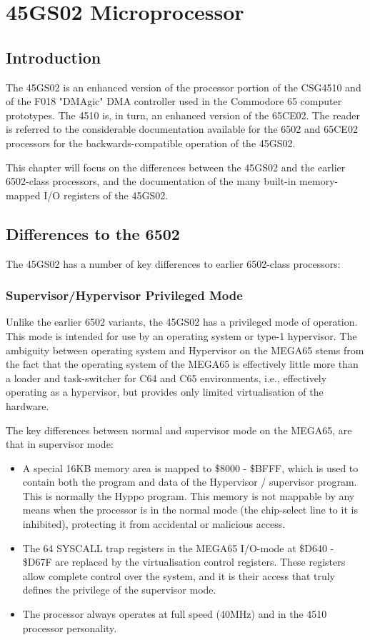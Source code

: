 \chapter{45GS02 Microprocessor}
\label{cha:cpu}
\label{cha:45gs02}
\section{Introduction}

The 45GS02 is an enhanced version of the processor portion of the CSG4510
and of the F018 "DMAgic" DMA controller used in the Commodore 65
computer prototypes.  The 4510 is, in turn,
an enhanced version of the 65CE02.
The reader is referred to
the considerable documentation available for the 6502 and 65CE02 processors
for the backwards-compatible operation of the 45GS02.

This chapter will
focus on the differences between the 45GS02 and the earlier 6502-class
processors, and the documentation of the many built-in memory-mapped I/O
registers of the 45GS02.

\section{Differences to the 6502}

The 45GS02 has a number of key differences to earlier 6502-class processors:

\subsection{Supervisor/Hypervisor Privileged Mode}

Unlike the earlier 6502 variants, the 45GS02 has a privileged mode of operation.
This mode is intended for use by an operating system or type-1
hypervisor.  The ambiguity between
operating system and Hypervisor on the MEGA65 stems from the fact that the operating
system of the MEGA65 is effectively little more than a loader and
task-switcher for C64 and C65
environments, i.e., effectively operating as a hypervisor, but provides
only limited virtualisation
of the hardware.

The key differences between normal and supervisor mode on the MEGA65, are that in
supervisor mode:

\begin{itemize}
\item A special 16KB memory area is mapped to \$8000 - \$BFFF, which is
 used to contain both
 the program and data of the Hypervisor / supervisor program.
 This is normally the Hyppo program.
  This memory is not mappable by any means when the processor is in the
 normal mode (the chip-select
  line to it is inhibited), protecting it from accidental or malicious access.
\item The 64 SYSCALL trap registers in the MEGA65 I/O-mode at
\$D640 - \$D67F are replaced by the
  virtualisation control registers.  These registers allow complete
control over the system, and
  it is their access that truly defines the privilege of the supervisor mode.
  \item The processor always operates at full speed (40MHz) and in the
 4510 processor personality.
\end{itemize}

